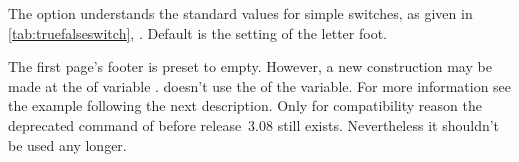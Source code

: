 The option understands the standard values for simple switches, as given in
\autoref{tab:truefalseswitch}, . Default is
the setting of the letter foot.
%

\begin{Declaration}
\end{Declaration}%
%
The first page's footer is preset to
empty. However, a new construction may be
made at the  of variable . \KOMAScript{}
doesn't use the  of the variable. For more information see
the example following the next description. Only for compatibility reason the
deprecated command  of
 before release~3.08 still exists. Nevertheless it shouldn't
be used any longer.

